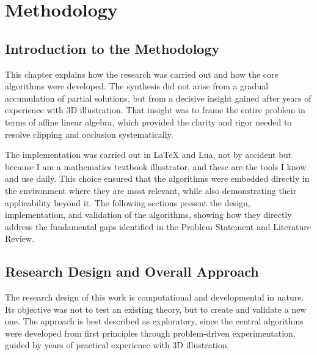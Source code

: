 \chapter{Methodology}

\section{Introduction to the Methodology}

This chapter explains how the research was carried out and how the 
core algorithms were developed. The synthesis did not arise from a 
gradual accumulation of partial solutions, but from a decisive 
insight gained after years of experience with \(3\)D illustration. 
That insight was to frame the entire problem in terms of affine 
linear algebra, which provided the clarity and rigor needed to 
resolve clipping and occlusion systematically.

The implementation was carried out in \LaTeX{} and Lua, not by 
accident but because I am a mathematics textbook illustrator, and 
these are the tools I know and use daily. This choice ensured that 
the algorithms were embedded directly in the environment where they 
are most relevant, while also demonstrating their applicability 
beyond it. The following sections present the design, implementation, 
and validation of the algorithms, showing how they directly address 
the fundamental gaps identified in the Problem Statement and 
Literature Review.

\section{Research Design and Overall Approach}

The research design of this work is computational and 
developmental in nature. Its objective was not to test an 
existing theory, but to create and validate a new one. The 
approach is best described as exploratory, since the central 
algorithms were developed from first principles through 
problem-driven experimentation, guided by years of practical 
experience with \(3\)D illustration. 

